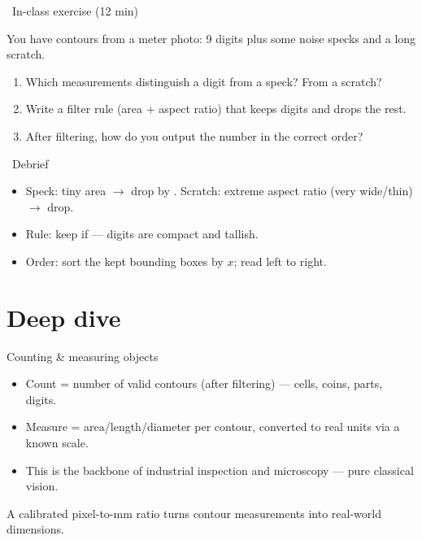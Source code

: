\documentclass[10pt,aspectratio=169]{beamer}
\begin{document}
\begin{frame}{\faPen~In-class exercise (12 min)}
  \begin{infobox}
  \end{infobox}
  You have contours from a meter photo: 9 digits plus some noise specks and a long scratch.
  \begin{enumerate}
    \item Which measurements distinguish a digit from a speck? From a scratch?
    \item Write a filter rule (area + aspect ratio) that keeps digits and drops the rest.
    \item After filtering, how do you output the number in the correct order?
  \end{enumerate}
\end{frame}

\begin{frame}{\faPen~Debrief}
  \begin{itemize}
    \item Speck: tiny area $\rightarrow$ drop by . Scratch: extreme aspect ratio (very wide/thin) $\rightarrow$ drop.
    \item Rule: keep if  — digits are compact and tallish.
    \item Order: sort the kept bounding boxes by $x$; read left to right.
  \end{itemize}
\end{frame}

\section{Deep dive}

\begin{frame}{Counting \& measuring objects}
  \begin{itemize}
    \item Count = number of valid contours (after filtering) — cells, coins, parts, digits.
    \item Measure = area/length/diameter per contour, converted to real units via a known scale.
    \item This is the backbone of industrial inspection and microscopy — pure classical vision.
  \end{itemize}
  \begin{goodbox}
    A calibrated pixel-to-mm ratio turns contour measurements into real-world dimensions.
  \end{goodbox}
\end{frame}
\end{document}

